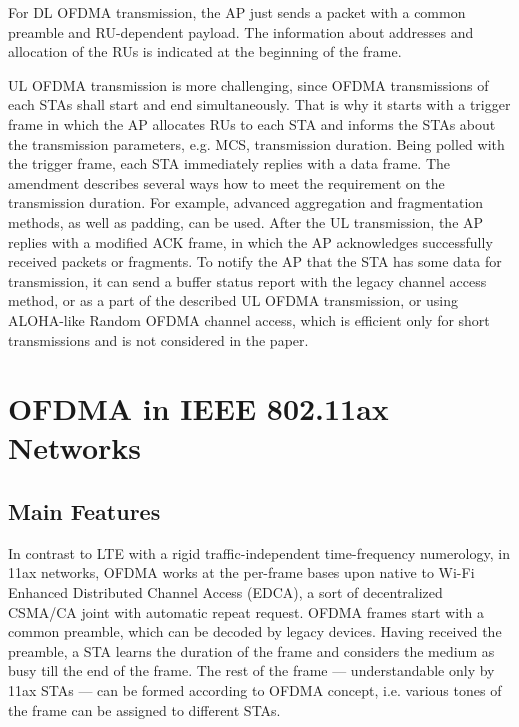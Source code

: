 For DL OFDMA transmission, the AP just sends a packet
with a common preamble and RU-dependent payload. The
information about addresses and allocation of the RUs is
indicated at the beginning of the frame.

UL OFDMA transmission is more challenging, since
OFDMA transmissions of each STAs shall start and end
simultaneously. That is why it starts with a trigger frame in
which the AP allocates RUs to each STA and informs the
STAs about the transmission parameters, e.g. MCS, transmission
duration. Being polled with the trigger frame, each
STA immediately replies with a data frame. The amendment
describes several ways how to meet the requirement on the
transmission duration. For example, advanced aggregation and
fragmentation methods, as well as padding, can be used. After
the UL transmission, the AP replies with a modified ACK
frame, in which the AP acknowledges successfully received
packets or fragments. To notify the AP that the STA has
some data for transmission, it can send a buffer status report
with the legacy channel access method, or as a part of the
described UL OFDMA transmission, or using ALOHA-like
Random OFDMA channel access, which is efficient only for
short transmissions and is not considered in the paper.

\section{OFDMA in IEEE 802.11ax Networks}
\label{sec:ofdma}
\subsection{Main Features}
\label{mainfeatures}




In contrast to LTE with a rigid traffic-independent time-frequency numerology, in 11ax networks, OFDMA works at the per-frame bases upon native to Wi-Fi Enhanced Distributed Channel Access (EDCA), a sort of decentralized CSMA/CA joint with automatic repeat request. OFDMA frames start with a common preamble, which can be decoded by legacy devices. Having received the preamble, a STA learns the duration of the frame and considers the medium as busy till the end of the frame.
The rest of the frame --- understandable only by 11ax STAs --- can be formed according to OFDMA concept, i.e. various tones of the frame can be assigned to different STAs. 

